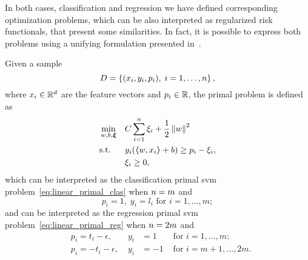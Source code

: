 In both cases, classification and regression we have defined corresponding optimization problems, which can be also interpreted as regularized risk functionals, that present some similarities. In fact, it is possible to express both problems using a unifying formulation presented in~\cite{Lin01}.
\begin{definition}
    Given a sample
    $$ D = \left\{(x_i, y_i, p_i), \; i=1, \ldots, n\right\} ,$$
    where $x_i \in \mathbb{R}^d$ are the feature vectors and $p_i \in \mathbb{R}$, 
    the primal problem is defined as
    \begin{equation}
        \label{eq:linear_primal}
        \begin{aligned}
            &\min_{w, b, \fv{\xi}} & & C \sum_{i=1}^\nsamples \xi_i + \frac{1}{2} \norm{w}^2 \\
            & \text{s.t.} & & y_i (\dotp{w}{x_i} + b) \geq p_i - \xi_i , \\
            & & & \xi_i \geq 0 ,      
        \end{aligned}  
    \end{equation}
    which can be interpreted as the classification primal \acrshort{svm} problem~\eqref{eq:linear_primal_clas} when $n=m$ and
    $$ p_i = 1,\; y_i = l_i \text{ for } i=1, \ldots, m ;$$
    and can be interpreted as the regression primal \acrshort{svm} problem~\eqref{eq:linear_primal_reg} when $n = 2 m$ and
    \begin{equation}
        \nonumber
        \begin{aligned}
            & p_i = t_i - \epsilon ,\; &y_i &= 1 &\text{ for } i=1, \ldots, m ; \\
            & p_i = -t_i - \epsilon ,\; &y_i &= -1 &\text{ for } i=m+1, \ldots, 2m .
        \end{aligned}
    \end{equation}
\end{definition}
%
